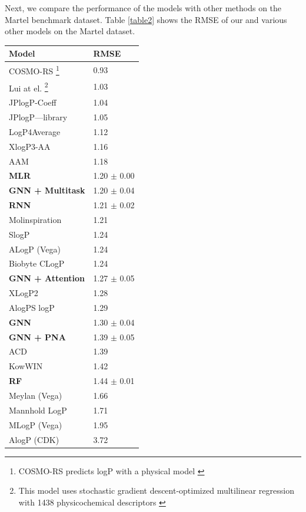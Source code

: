 \documentclass{article}
\theoremstyle{definition}
\theoremstyle{remark}
\begin{document}
Next, we compare the performance of the models with other methods on the Martel benchmark dataset. Table \ref{table2} shows the RMSE of our and various other models on the Martel dataset.

\begin{center}
\begin{tabular}{ | m{5cm} | m{2.5cm}| } 
  \hline
  \textbf{Model} & \textbf{RMSE} \\ 
  \hline
  COSMO-RS \footnote{COSMO-RS predicts logP with a physical model \cite{ulrich2021exploring}} & 0.93 \\
  \hline
  Lui at el. \footnote{This model uses stochastic gradient descent-optimized multilinear regression with 1438 physicochemical descriptors \cite{lui2020comparison}} & 1.03 \\
  \hline
  JPlogP-Coeff & 1.04 \\ 
  \hline
  JPlogP—library & 	1.05 \\
  \hline
  LogP4Average & 1.12 \\ 
  \hline
  XlogP3-AA & 1.16 \\
  \hline
  AAM & 1.18 \\ 
  \hline
  \textbf{MLR} & 1.20 $\pm$ 0.00 \\ 
  \hline
  \textbf{GNN + Multitask} & 1.20 $\pm$ 0.04 \\ 
  \hline
  \textbf{RNN} & 1.21 $\pm$ 0.02 \\
  \hline
  Molinspiration & 	1.21 \\ 
  \hline
  SlogP & 1.24 \\ 
  \hline
  ALogP (Vega) & 1.24 \\
  \hline
  Biobyte CLogP & 	1.24 \\ 
  \hline
  \textbf{GNN + Attention} & 1.27 $\pm$ 0.05 \\
  \hline
  XLogP2 & 	1.28 \\ 
  \hline
  AlogPS logP & 1.29 \\ 
  \hline
  \textbf{GNN} & 1.30 $\pm$ 0.04 \\
  \hline
  \textbf{GNN + PNA} & 1.39 $\pm$ 0.05 \\
  \hline
  ACD & 1.39 \\
  \hline
  KowWIN & 1.42 \\
  \hline
  \textbf{RF} & 1.44 $\pm$ 0.01 \\
  \hline
  Meylan (Vega) & 1.66 \\
  \hline
  Mannhold LogP & 1.71 \\
  \hline
  MLogP (Vega) & 1.95 \\
  \hline
  AlogP (CDK) & 3.72 \\
  \hline
\end{tabular}
\captionsetup{width=0.8\textwidth}
\label{table2}
\end{center}
\end{document}
